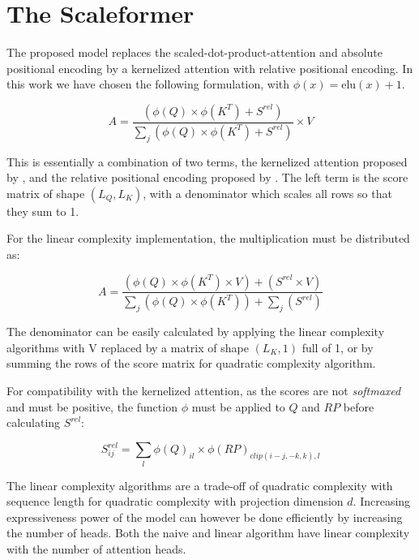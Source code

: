 \section{The Scaleformer}

The proposed model replaces the scaled-dot-product-attention  and absolute positional encoding by a kernelized attention with relative positional encoding.
In this work we have chosen the following formulation, with $\phi(x) = \mathrm{elu}(x) + 1$.

\begin{equation}
A = \frac{\left( \phi(Q) \times \phi(K^T) + S^{rel} \right)}{\sum_j \left( \phi(Q) \times \phi(K^T) + S^{rel} \right)} \times V
\end{equation}

This is essentially a combination of two terms, the kernelized attention
proposed by  \citet{katharopoulos2020transformers}, and the relative positional encoding proposed by
\citet{shaw2018selfattention}. The left
term is the score matrix of shape $(L_Q, L_K)$, with a denominator
which scales all rows so that they sum to 1.

For the linear complexity implementation, the multiplication must be distributed as:

\begin{equation}
A = \frac{\left( \phi(Q) \times \phi(K^T) \times V \right) + \left( S^{rel} \times V\right)}{\sum_j \left( \phi(Q) \times \phi(K^T) \right) + \sum_j \left( S^{rel} \right)}
\end{equation}

The denominator can be easily calculated by applying the linear complexity algorithms with V replaced by a matrix of shape $(L_K, 1)$ full of 1, or by summing the rows of the score matrix for quadratic complexity algorithm.

For compatibility with the kernelized attention, as the scores are not \emph{softmaxed} and must be positive, the function $\phi$ must be applied to $Q$ and $RP$ before calculating $S^{rel}$:

\begin{equation}
	S^{rel}_{ij} = \sum_l \phi(Q)_{il} \times \phi(RP)_{clip(i-j, -k, k), l}
\end{equation}

The linear complexity algorithms are a trade-off of quadratic complexity with sequence length for quadratic complexity with projection dimension $d$. Increasing expressiveness power of the model can however be done efficiently by increasing the number of heads. Both the naive and linear algorithm have linear complexity with the number of attention heads.

\endinput

